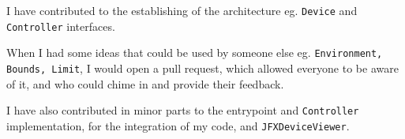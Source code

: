 I have contributed to the establishing of the architecture eg. \texttt{Device} and \texttt{Controller} interfaces.

When I had some ideas that could be used by someone else eg. \texttt{Environment, Bounds, Limit},
I would open a pull request, which allowed everyone to be aware of it, and who could chime in and provide their feedback.

I have also contributed in minor parts to the entrypoint and \texttt{Controller} implementation, for the integration of my code,
and \texttt{JFXDeviceViewer}.
